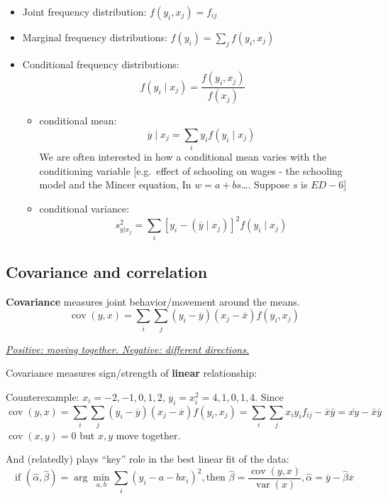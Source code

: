 \begin{itemize}
    \item Joint frequency distribution: \(f(y_{i},x_{j}) = f_{ij}\)
    \item Marginal frequency distributions: $f (y _ {i}) = \sum_ {j} f (y _ {i}, x _ {j})$
    \item Conditional frequency distributions: \[
              f (y _ {i} \mid x _ {j}) = \frac {f (y _ {i} , x _ {j})}{f (x _ {j})}
          \] \begin{itemize}
              \item conditional mean: \[
                        \overline {{y}} \mid x _ {j} = \sum_ {i} y _ {i} f (y _ {i} \mid x _ {j})
                    \]
                    We are often interested in how a conditional mean varies with the conditioning variable [e.g.~effect of schooling on wages - the schooling model and the Mincer equation, In \(w = a + b s\)\ldots. Suppose \(s\) is \(ED - 6\)]

              \item conditional variance: \[
                        s _ {y | x _ {j}} ^ {2} = \sum_ {i} \left[ y _ {i} - \left(\overline {{y}} \mid x _ {j}\right) \right] ^ {2} f (y _ {i} \mid x _ {j})
                    \]
          \end{itemize}
\end{itemize}

\subsection{Covariance and correlation}
\begin{definition}
    \textbf{Covariance} measures joint behavior/movement around the means.
    \[
        \operatorname {cov} (y, x) = \sum_ {i} \sum_ {j} (y _ {i} - \overline {{y}}) (x _ {j} - \overline {{x}}) f (y _ {i}, x _ {j})
    \]
\end{definition}
\begin{remark*} \underline{\textit{Positive: moving together.  Negative: different directions.}}

    Covariance measures sign/strength of \textbf{linear} relationship:

    Counterexample: $x_i = -2,-1,0,1,2$, $y_i=x_i ^{2}=4,1,0,1,4$.
    Since
    \[
        \operatorname {cov} (y, x) = \sum_ {i} \sum_ {j} (y _ {i} - \overline {{y}}) (x _ {j} - \overline {{x}}) f (y _ {i}, x _ {j}) = \sum_{i} \sum_{j} x_iy_if_{ij} - \bar{x}\bar{y} = \bar{xy} - \bar{x}\bar{y}
    \]
    $\operatorname{cov}(x,y)=0$ but $x,y$ move together.

    And (relatedly) plays ``key'' role in the best linear fit of
    the data: \[
        \text{if } (\widehat {\alpha}, \widehat {\beta}) = \arg \min _ {a, b} \sum_ {i} (y _ {i} - a - b x _ {i}) ^ {2}, \text{then } \widehat {\beta} = \frac {\operatorname {c o v} (y , x)}{\operatorname {v a r} (x)}, \widehat {\alpha} = \overline {{y}} - \widehat {\beta} \overline {{x}}
    \]
\end{remark*}

